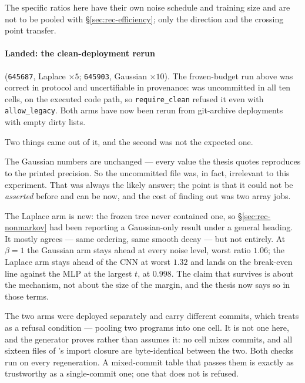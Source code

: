 \begin{pitfall}
The specific ratios here have their own noise schedule and training size and are not to be
pooled with \S\ref{sec:rec-efficiency}; only the direction and the crossing point transfer.
\end{pitfall}

\paragraph{Landed: the clean-deployment rerun} (\texttt{645687}, Laplace $\times5$;
\texttt{645903}, Gaussian $\times10$). The frozen-budget run above was correct in protocol and
uncertifiable in provenance:  was uncommitted in all ten cells, on the
executed code path, so \texttt{require\_clean} refused it even with \texttt{allow\_legacy}.
Both arms have now been rerun from git-archive deployments with empty dirty lists.

Two things came out of it, and the second was not the expected one.

The Gaussian numbers are unchanged --- every value the thesis quotes reproduces to the printed
precision. So the uncommitted file was, in fact, irrelevant to this experiment. That was always
the likely answer; the point is that it could not be \emph{asserted} before and can be now, and
the cost of finding out was two array jobs.

The Laplace arm is new: the frozen tree never contained one, so \S\ref{sec:rec-nonmarkov} had
been reporting a Gaussian-only result under a general heading. It mostly agrees --- same
ordering, same smooth decay --- but not entirely. At $\beta=1$ the Gaussian arm stays ahead at
every noise level, worst ratio $1.06$; the Laplace arm stays ahead of the CNN at worst $1.32$
and lands on the break-even line against the MLP at the largest $t$, at $0.998$. The claim that
survives is about the mechanism, not about the size of the margin, and the thesis now says so
in those terms.

\begin{pitfall}
The two arms were deployed separately and carry different commits, which
 treats as a refusal condition --- pooling two programs into
one cell. It is not one here, and the generator proves rather than assumes it: no cell mixes
commits, and all sixteen files of 's import closure
are byte-identical between the two. Both checks run on every regeneration. A mixed-commit table
that passes them is exactly as trustworthy as a single-commit one; one that does not is refused.
\end{pitfall}

